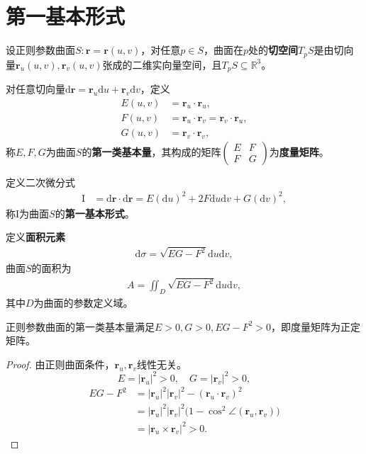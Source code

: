 \documentclass[../../main.tex]{subfiles}%
\begin{document}
\section{第一基本形式}

\begin{definition}
设正则参数曲面$S:\boldsymbol{r}=\boldsymbol{r}(u,v)$，对任意$p\in S$，曲面在$p$处的\textbf{切空间}$T_pS$是由切向量$\boldsymbol{r}_u(u,v),\boldsymbol{r}_v(u,v)$张成的二维实向量空间，且$T_pS\subseteq\mathbb{R}^3$。

对任意切向量$\mathrm{d}\boldsymbol{r}=\boldsymbol{r}_u\mathrm{d}u+\boldsymbol{r}_v\mathrm{d}v$，定义
\begin{align}
E(u,v)&=\boldsymbol{r}_u\cdot\boldsymbol{r}_u,\label{eq:E}\\
F(u,v)&=\boldsymbol{r}_u\cdot\boldsymbol{r}_v=\boldsymbol{r}_v\cdot\boldsymbol{r}_u,\label{eq:F}\\
G(u,v)&=\boldsymbol{r}_v\cdot\boldsymbol{r}_v,\label{eq:G}
\end{align}
称$E,F,G$为曲面$S$的\textbf{第一类基本量}，其构成的矩阵$\begin{pmatrix}E&F\\F&G\end{pmatrix}$为\textbf{度量矩阵}。

定义二次微分式
\begin{align}
\mathrm{I}&=\mathrm{d}\boldsymbol{r}\cdot\mathrm{d}\boldsymbol{r}=E(\mathrm{d}u)^2+2F\mathrm{d}u\mathrm{d}v+G(\mathrm{d}v)^2,\label{eq:firstfundform}
\end{align}
称$\mathrm{I}$为曲面$S$的\textbf{第一基本形式}。

定义\textbf{面积元素}
\begin{align}
\mathrm{d}\sigma=\sqrt{EG-F^2}\mathrm{d}u\mathrm{d}v,\label{eq:areaelement}
\end{align}
曲面$S$的面积为
\begin{align}
A=\iint_D\sqrt{EG-F^2}\mathrm{d}u\mathrm{d}v,\label{eq:area}
\end{align}
其中$D$为曲面的参数定义域。
\end{definition}

\begin{proposition}
正则参数曲面的第一类基本量满足$E>0,G>0,EG-F^2>0$，即度量矩阵为正定矩阵。
\end{proposition}
\begin{proof}
由正则曲面条件，$\boldsymbol{r}_u,\boldsymbol{r}_v$线性无关。
\[
E=|\boldsymbol{r}_u|^2>0,\quad G=|\boldsymbol{r}_v|^2>0,
\]
\begin{align*}
EG-F^2&=|\boldsymbol{r}_u|^2|\boldsymbol{r}_v|^2-(\boldsymbol{r}_u\cdot\boldsymbol{r}_v)^2\\
&=|\boldsymbol{r}_u|^2|\boldsymbol{r}_v|^2\big(1-\cos^2\angle(\boldsymbol{r}_u,\boldsymbol{r}_v)\big)\\
&=|\boldsymbol{r}_u\times\boldsymbol{r}_v|^2>0.
\end{align*}
\end{proof}
\end{document}
